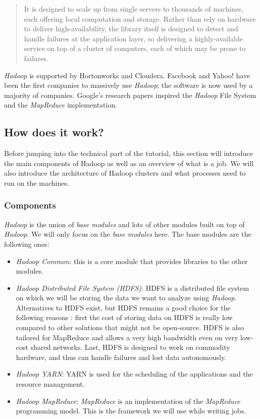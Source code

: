 \documentclass[a4paper, 12pt]{article}
\begin{document}
\begin{quote}
It is designed to scale up from single servers to thousands of machines, each offering local computation and storage. Rather than rely on hardware to deliver high-availability, the library itself is designed to detect and handle failures at the application layer, so delivering a highly-available service on top of a cluster of computers, each of which may be prone to failures.
\end{quote}

\textit{Hadoop} is supported by Hortonworks and Cloudera. Facebook and Yahoo! have been the first companies to massively use \textit{Hadoop}; the software is now used by a majority of companies. Google's research papers \cite{google_1} \cite{google_2} inspired the \textit{Hadoop} File System and the \textit{MapReduce} implementation.

  \subsection{How does it work?}

Before jumping into the technical part of the tutorial, this section will introduce the main components of Hadoop as well as an overview of what is a job. We will also introduce the architecture of Hadoop clusters and what processes need to run on the machines.

    \subsubsection{Components}
  
\textit{Hadoop} is the union of \textit{base modules} and lots of other modules built on top of \textit{Hadoop}. We will only focus on the \textit{base modules} here. The base modules are the following ones:
\begin{itemize}
  \item \textit{\textit{Hadoop} Common}: this is a core module that provides libraries to the other modules.
  \item \textit{\textit{Hadoop} Distributed File System (HDFS)}: HDFS is a distributed file system on which we will be storing the data we want to analyze using \textit{Hadoop}. Alternatives to HDFS exist, but HDFS remains a good choice for the following reasons \cite{horton}: first the cost of storing data on HDFS is really low compared to other solutions that might not be open-source. HDFS is also tailored for MapReduce and allows a very high bandwidth even on very low-cost shared networks. Last, HDFS is designed to work on commodity hardware, and thus can handle failures and lost data autonomously.
  \item \textit{\textit{Hadoop} YARN}: YARN is used for the scheduling of the applications and the resource management.
  \item \textit{\textit{Hadoop} MapReduce}: \textit{MapReduce} is an implementation of the \textit{MapReduce} programming model. This is the framework we will use while writing jobs.
\end{itemize}
\end{document}
